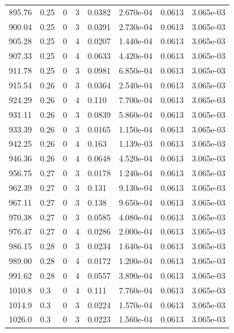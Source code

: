 \documentclass[preview]{standalone}
\begin{document}
{{{{{{\begin{tabular}{L{1.2cm}C{1.2cm} C{0.3cm}C{0.5cm} C{1.4cm}C{1.4cm} C{1.4cm}C{1.4cm}}
  895.76  &  0.25  & 0     &  3 &  0.0382  & 2.670e-04  & 0.0613 &  3.065e-03   \\ 
  900.04  &  0.25  & 0     &  3 &  0.0391  & 2.730e-04  & 0.0613 &  3.065e-03   \\ 
  905.28  &  0.25  & 0     &  4 &  0.0207  & 1.440e-04  & 0.0613 &  3.065e-03   \\ 
  907.33  &  0.25  & 0     &  4 &  0.0633  & 4.420e-04  & 0.0613 &  3.065e-03   \\ 
  911.78  &  0.25  & 0     &  3 &  0.0981  & 6.850e-04  & 0.0613 &  3.065e-03   \\ 
  915.54  &  0.26  & 0     &  3 &  0.0364  & 2.540e-04  & 0.0613 &  3.065e-03   \\ 
  924.29  &  0.26  & 0     &  4 &  0.110  & 7.700e-04  & 0.0613 &  3.065e-03   \\ 
  931.11  &  0.26  & 0     &  3 &  0.0839  & 5.860e-04  & 0.0613 &  3.065e-03   \\ 
  933.39  &  0.26  & 0     &  3 &  0.0165  & 1.150e-04  & 0.0613 &  3.065e-03   \\ 
  942.25  &  0.26  & 0     &  4 &  0.163  & 1.139e-03  & 0.0613 &  3.065e-03   \\ 
  946.36  &  0.26  & 0     &  4 &  0.0648  & 4.520e-04  & 0.0613 &  3.065e-03   \\ 
  956.75  &  0.27  & 0     &  3 &  0.0178  & 1.240e-04  & 0.0613 &  3.065e-03   \\ 
  962.39  &  0.27  & 0     &  3 &  0.131  & 9.130e-04  & 0.0613 &  3.065e-03   \\ 
  967.11  &  0.27  & 0     &  3 &  0.138  & 9.650e-04  & 0.0613 &  3.065e-03   \\ 
  970.38  &  0.27  & 0     &  3 &  0.0585  & 4.080e-04  & 0.0613 &  3.065e-03   \\ 
  976.47  &  0.27  & 0     &  4 &  0.0286  & 2.000e-04  & 0.0613 &  3.065e-03   \\ 
  986.15  &  0.28  & 0     &  3 &  0.0234  & 1.640e-04  & 0.0613 &  3.065e-03   \\ 
  989.00  &  0.28  & 0     &  4 &  0.0172  & 1.200e-04  & 0.0613 &  3.065e-03   \\ 
  991.62  &  0.28  & 0     &  4 &  0.0557  & 3.890e-04  & 0.0613 &  3.065e-03   \\ 
  1010.8  &   0.3  & 0     &  4 &  0.111  & 7.760e-04  & 0.0613 &  3.065e-03   \\ 
  1014.9  &   0.3  & 0     &  3 &  0.0224  & 1.570e-04  & 0.0613 &  3.065e-03   \\ 
  1026.0  &   0.3  & 0     &  3 &  0.0223  & 1.560e-04  & 0.0613 &  3.065e-03   \\ 

\end{tabular}}}}}}}
\end{document}
